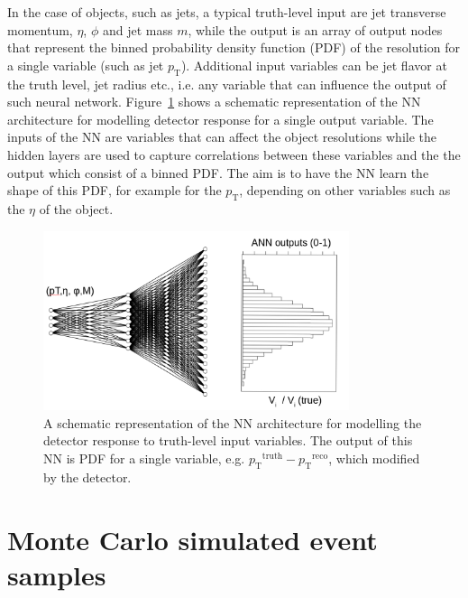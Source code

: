 \documentclass[showpacs,showkeys,preprint,prd,nofootinbib,linenumbers,12pt]{revtex4-1}
\def\pt{\ensuremath{p_{\mathrm{T}}}}
\def\ptRes{\ensuremath{\pt^{\mathrm{truth}}-\pt^{\mathrm{reco}}}}
\begin{document}
In the case of objects, such as jets, a typical truth-level input are jet transverse momentum, $\eta$, $\phi$ and jet mass $m$, while the output
is an array of output nodes that represent the binned probability density function (PDF) of the resolution for a single variable (such as jet \pt). Additional input variables can be jet flavor at the truth level, jet radius etc., i.e. any variable that 
can influence the output of such neural network. Figure~\ref{ann_example} shows a schematic representation of the NN architecture for modelling detector response for a single output variable. The inputs of the NN are variables that can affect the object resolutions while the hidden layers are used to capture correlations between these variables and the the output which consist of a binned PDF. The aim is to have the NN learn the shape of this PDF, for example for the $\pt$, depending on other variables such as the $\eta$ of the object.

\begin{figure}[h]
  \includegraphics[width=0.8\textwidth]{figures/intro/nn_example.png}
  \caption{A schematic representation of the NN architecture for modelling the detector response to truth-level input variables. The output of this NN is PDF for a single variable, e.g. \ptRes, which modified by the detector.}
  \label{ann_example}
\end{figure}


\section{Monte Carlo simulated event samples}
\end{document}
